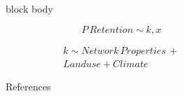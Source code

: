 \documentclass[final,hyperref={pdfpagelabels=false}]{beamer}
\begin{document}
\begin{frame}[t]
\begin{columns}[t]
\begin{column}{.465\textwidth}
{
\begin{beamercolorbox}[wd=\textwidth,rounded=true]{block body}

\begin{equation*}
P\, Retention \sim k, x
\end{equation*}

\begin{equation*}
\begin{split}
k \sim Network\, Properties\, + \\ Landuse + Climate
\end{split}
\end{equation*}

\end{beamercolorbox}
}



\begin{block}{References}
        
\nocite{*} %
\small{
}

\end{block}


\end{column} %

\begin{column}{.015\textwidth}\end{column} %

\end{columns} %

\end{frame} %
\end{document}
